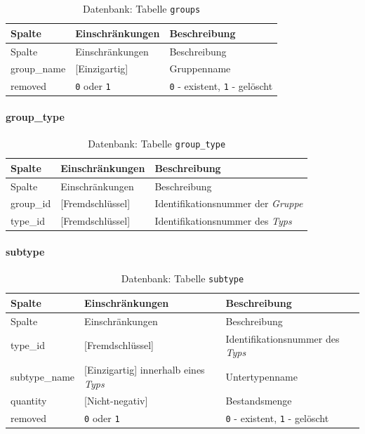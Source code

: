 \documentclass[
]{article}
\begin{document}
\begin{longtable}[]{@{}lll@{}}
\caption{\label{tab:groups} Datenbank: Tabelle \texttt{groups}}\tabularnewline
\toprule
Spalte & Einschränkungen & Beschreibung \\
\midrule
\endfirsthead
\toprule
Spalte & Einschränkungen & Beschreibung \\
\midrule
\endhead
group\_name & {[}Einzigartig{]} & Gruppenname \\
removed & \texttt{0} oder \texttt{1} & \texttt{0} - existent, \texttt{1} - gelöscht \\
\bottomrule
\end{longtable}

\hypertarget{group_type}{%
\paragraph{group\_type}\label{group_type}}

\begin{longtable}[]{@{}lll@{}}
\caption{\label{tab:group-type} Datenbank: Tabelle \texttt{group\_type}}\tabularnewline
\toprule
Spalte & Einschränkungen & Beschreibung \\
\midrule
\endfirsthead
\toprule
Spalte & Einschränkungen & Beschreibung \\
\midrule
\endhead
group\_id & {[}Fremdschlüssel{]} & Identifikationsnummer der \emph{Gruppe} \\
type\_id & {[}Fremdschlüssel{]} & Identifikationsnummer des \emph{Typs} \\
\bottomrule
\end{longtable}

\hypertarget{subtype}{%
\paragraph{subtype}\label{subtype}}

\begin{longtable}[]{@{}lll@{}}
\caption{\label{tab:subtype} Datenbank: Tabelle \texttt{subtype}}\tabularnewline
\toprule
Spalte & Einschränkungen & Beschreibung \\
\midrule
\endfirsthead
\toprule
Spalte & Einschränkungen & Beschreibung \\
\midrule
\endhead
type\_id & {[}Fremdschlüssel{]} & Identifikationsnummer des \emph{Typs} \\
subtype\_name & {[}Einzigartig{]} innerhalb eines \emph{Typs} & Untertypenname \\
quantity & {[}Nicht-negativ{]} & Bestandsmenge \\
removed & \texttt{0} oder \texttt{1} & \texttt{0} - existent, \texttt{1} - gelöscht \\
\bottomrule
\end{longtable}
\end{document}
